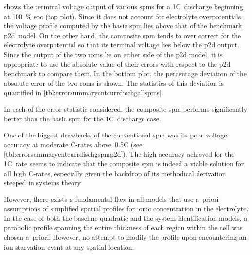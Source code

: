   shows the  terminal voltage  output of
various \glspl{spm} for a 1C~discharge beginning at \SI{100}{\percent} \gls{soc}
(top  plot). Since  it  does  not account  for  electrolyte overpotentials,  the
voltage profile computed by the basic \gls{spm} lies above that of the benchmark
\gls{p2d}  model. On  the  other hand,  the composite  \gls{spm}  tends to  over
correct  for the  electrolyte overpotential  so that  its terminal  voltage lies
below  the \gls{p2d}  output. Since  the output  of the  two \glspl{rom}  lie on
either side of the \gls{p2d} model, it  is appropriate to use the absolute value
of their errors with respect to the  \gls{p2d} benchmark to compare them. In the
bottom  plot,  the  percentage  deviation  of the  absolute  error  of  the  two
\glspl{rom} is shown. The statistics of this deviation is quantified
in \cref{tbl:errorsummarycntcurrdischgallspms}.



In  each of  the error  statistic considered,  the composite  \gls{spm} performs
significantly better than the basic \gls{spm} for the 1C~discharge case.

One   of   the   biggest   drawbacks   of   the   conventional   \gls{spm}   was
its    poor    voltage    accuracy    at    moderate    C-rates    above~0.5C
(see \cref{tbl:errorsummarycntcurrdischgspmp2d}). The high accuracy achieved for
the 1C~rate  seems to indicate that  the composite \gls{spm} is  indeed a viable
solution for all  high C-rates, especially given the backdrop  of its methodical
derivation steeped in systems theory.

However,  there exists  a  fundamental  flaw in  all  models  that use  a~priori
assumptions  of  simplified spatial  profiles  for  ionic concentration  in  the
electrolyte.  In  the  case  of  both the  baseline  quadratic  and  the  system
identification models, a parabolic profile spanning the entire thickness of each
region within the cell was chosen a~priori. However, no attempt to modify the
profile upon encountering an ion starvation event at any spatial location.

